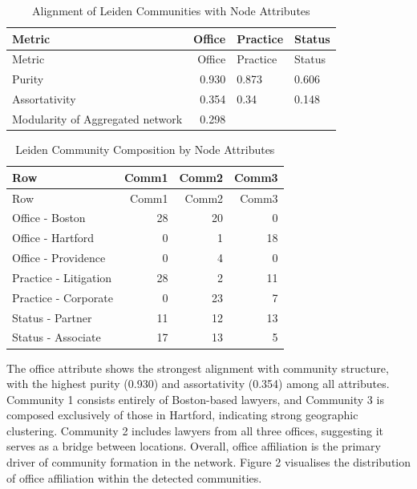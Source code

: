 \documentclass[
]{article}
\begin{document}
\begin{longtable}[]{@{}lrll@{}}
\caption{Alignment of Leiden Communities with Node
Attributes}\tabularnewline
\toprule\noalign{}
Metric & Office & Practice & Status \\
\midrule\noalign{}
\endfirsthead
\toprule\noalign{}
Metric & Office & Practice & Status \\
\midrule\noalign{}
\endhead
\bottomrule\noalign{}
\endlastfoot
Purity & 0.930 & 0.873 & 0.606 \\
Assortativity & 0.354 & 0.34 & 0.148 \\
Modularity of Aggregated network & 0.298 & & \\
\end{longtable}

\begin{longtable}[]{@{}lrrr@{}}
\caption{Leiden Community Composition by Node Attributes}\tabularnewline
\toprule\noalign{}
Row & Comm1 & Comm2 & Comm3 \\
\midrule\noalign{}
\endfirsthead
\toprule\noalign{}
Row & Comm1 & Comm2 & Comm3 \\
\midrule\noalign{}
\endhead
\bottomrule\noalign{}
\endlastfoot
Office - Boston & 28 & 20 & 0 \\
Office - Hartford & 0 & 1 & 18 \\
Office - Providence & 0 & 4 & 0 \\
Practice - Litigation & 28 & 2 & 11 \\
Practice - Corporate & 0 & 23 & 7 \\
Status - Partner & 11 & 12 & 13 \\
Status - Associate & 17 & 13 & 5 \\
\end{longtable}

The office attribute shows the strongest alignment with community
structure, with the highest purity (0.930) and assortativity (0.354)
among all attributes. Community 1 consists entirely of Boston-based
lawyers, and Community 3 is composed exclusively of those in Hartford,
indicating strong geographic clustering. Community 2 includes lawyers
from all three offices, suggesting it serves as a bridge between
locations. Overall, office affiliation is the primary driver of
community formation in the network. Figure 2 visualises the distribution
of office affiliation within the detected communities.
\end{document}
